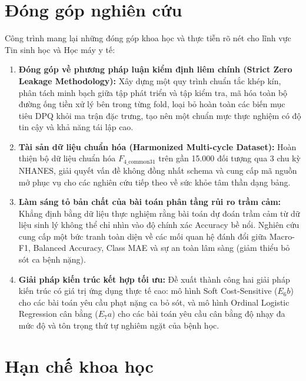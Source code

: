 \section{Đóng góp nghiên cứu}
\label{sec:dong-gop-khoa-hoc}

Công trình mang lại những đóng góp khoa học và thực tiễn rõ nét cho lĩnh vực Tin sinh học và Học máy y tế:
\begin{enumerate}
    \item \textbf{Đóng góp về phương pháp luận kiểm định liêm chính (Strict Zero Leakage Methodology):} Xây dựng một quy trình chuẩn tắc khép kín, phân tách minh bạch giữa tập phát triển và tập kiểm tra, mã hóa toàn bộ đường ống tiền xử lý bên trong từng fold, loại bỏ hoàn toàn các biến mục tiêu DPQ khỏi ma trận đặc trưng, tạo nên một chuẩn mực thực nghiệm có độ tin cậy và khả năng tái lập cao.
    \item \textbf{Tài sản dữ liệu chuẩn hóa (Harmonized Multi-cycle Dataset):} Hoàn thiện bộ dữ liệu chuẩn hóa $F_{4\_\text{common31}}$ trên gần 15.000 đối tượng qua 3 chu kỳ NHANES, giải quyết vấn đề không đồng nhất schema và cung cấp mã nguồn mở phục vụ cho các nghiên cứu tiếp theo về sức khỏe tâm thần dạng bảng.
    \item \textbf{Làm sáng tỏ bản chất của bài toán phân tầng rủi ro trầm cảm:} Khẳng định bằng dữ liệu thực nghiệm rằng bài toán dự đoán trầm cảm từ dữ liệu sinh lý không thể chỉ nhìn vào độ chính xác Accuracy bề nổi. Nghiên cứu cung cấp một bức tranh toàn diện về các mối quan hệ đánh đổi giữa Macro-F1, Balanced Accuracy, Class MAE và sự an toàn lâm sàng (giảm thiểu bỏ sót ca bệnh nặng).
    \item \textbf{Giải pháp kiến trúc kết hợp tối ưu:} Đề xuất thành công hai giải pháp kiến trúc có giá trị ứng dụng thực tế cao: mô hình Soft Cost-Sensitive ($E_6b$) cho các bài toán yêu cầu phạt nặng ca bỏ sót, và mô hình Ordinal Logistic Regression cân bằng ($E_7a$) cho các bài toán yêu cầu cân bằng độ nhạy đa mức độ và tôn trọng thứ tự nghiêm ngặt của bệnh học.
\end{enumerate}

\section{Hạn chế khoa học}
\label{sec:han-che-khoa-hoc}

